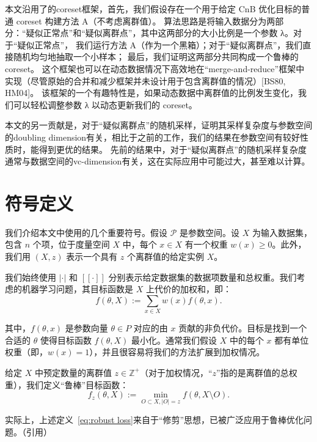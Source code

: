 本文沿用了\citet{Wang2021RobustAF}的coreset框架，首先，我们假设存在一个用于给定 CnB 优化目标的普通 coreset 构建方法 A（不考虑离群值）。
算法思路是将输入数据分为两部分：“疑似正常点”和“疑似离群点”，其中这两部分的大小比例是一个参数 λ。对于“疑似正常点”，
我们运行方法 A（作为一个黑箱）；对于“疑似离群点”，我们直接随机均匀地抽取一个小样本；
最后，我们证明这两部分共同构成一个鲁棒的 coreset。
这个框架也可以在动态数据情况下高效地在“merge-and-reduce”框架中实现（尽管原始的合并和减少框架并未设计用于包含离群值的情况）[BS80, HM04]。
该框架的一个有趣特性是，如果动态数据中离群值的比例发生变化，我们可以轻松调整参数 λ 以动态更新我们的 coreset。

本文的另一贡献是，对于“疑似离群点”的随机采样，证明其采样复杂度与参数空间的doubling dimension有关，相比于之前的工作，我们的结果在参数空间有较好性质时，能得到更优的结果。
先前的结果中，对于“疑似离群点”的随机采样复杂度通常与数据空间的vc-dimension有关，这在实际应用中可能过大，甚至难以计算。




\section{符号定义}


我们介绍本文中使用的几个重要符号。假设 $\mathcal{P}$ 是参数空间。设 $X$ 为输入数据集，包含 $n$ 个项，位于度量空间 $X$ 中，每个 $x \in X$ 有一个权重 $w(x) \geq 0$。此外，我们用 $(X, z)$ 表示一个具有 $z$ 个离群值的给定实例 $X$。

我们始终使用 $| \cdot |$ 和 $[[ \cdot ]]$ 分别表示给定数据集的数据项数量和总权重。我们考虑的机器学习问题，其目标函数是 $X$ 上代价的加权和，即：
\begin{equation}
f(\theta, X) := \sum_{x \in X} w(x) f(\theta, x).
\label{eq:loss}
\end{equation}

其中，$f(\theta, x)$ 是参数向量 $\theta \in P$ 对应的由 $x$ 贡献的非负代价。目标是找到一个合适的 $\theta$ 使得目标函数 $f(\theta, X)$ 最小化。通常我们假设 $X$ 中的每个 $x$ 都有单位权重（即，$w(x) = 1$），并且很容易将我们的方法扩展到加权情况。

给定 $X$ 中预定数量的离群值 $z \in \mathbb{Z}^+$（对于加权情况，“$z$”指的是离群值的总权重），我们定义“鲁棒”目标函数：
\begin{equation}
f_z(\theta, X) := \min_{O \subset X, |O| = z} f(\theta, X \setminus O).
\label{eq:robust loss}
\end{equation}

实际上，上述定义~\eqref{eq:robust loss}来自于“修剪”思想，已被广泛应用于鲁棒优化问题。（引用）

